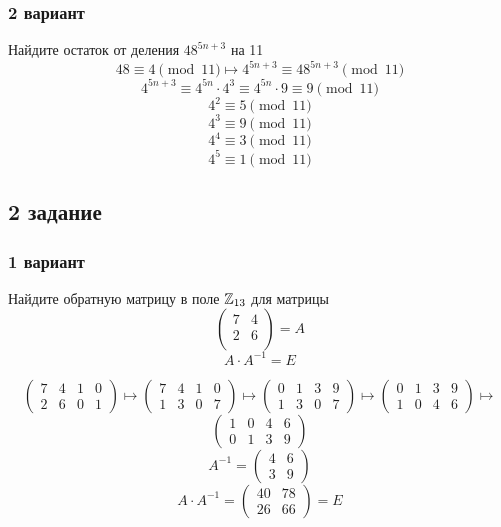 \subsubsection{2 вариант}
Найдите остаток от деления $48^{5n+3}$ на 11 \\
$$48 \equiv 4 \pmod{11}\longmapsto 4^{5n+3}\equiv 48^{5n+3} \pmod{11}  $$
$$4^{5n+3} \equiv  4^{5n}\cdot 4^3 \equiv 4^{5n}\cdot 9 \equiv 9 \pmod{11} $$
$$4^2 \equiv 5 \pmod{11}$$  
$$4^3 \equiv 9 \pmod{11} $$
$$4^4 \equiv 3\pmod{11} $$
$$4^5 \equiv 1 \pmod{11}$$
\subsection{2 задание }
\subsubsection{1 вариант}
Найдите обратную матрицу в поле $\mathbb{Z}_{13}$ для матрицы 
$$\begin{pmatrix}
	7 & 4 \\2 & 6\\
\end{pmatrix} = A$$
$$A\cdot A^{-1} = E$$

\[
\left(
\begin{array}{cc|cc}
7 & 4 & 1 & 0 \\
2 & 6 & 0 & 1
\end{array}
\right)\longmapsto \left(
\begin{array}{cc|cc}
7 & 4 & 1 & 0 \\
1 & 3 & 0 & 7
\end{array}
\right)\longmapsto \left( \begin{array}{cc|cc}
0 & 1 & 3 & 9 \\
1 & 3 & 0 & 7
\end{array}\right)
\longmapsto \left( \begin{array}{cc|cc}
0 & 1 & 3 & 9 \\
1 & 0 & 4 & 6
\end{array}\right) \longmapsto
\]
\[
 \left( \begin{array}{cc|cc}
	1 & 0 & 4 & 6\\
	0 & 1 & 3 & 9 
\end{array}\right) 
\]
$$A^{-1} = \begin{pmatrix}4 & 6\\ 3 & 9\end{pmatrix}$$
$$A\cdot A^{-1} = \begin{pmatrix}40 & 78 \\ 26 & 66\end{pmatrix} = E$$
